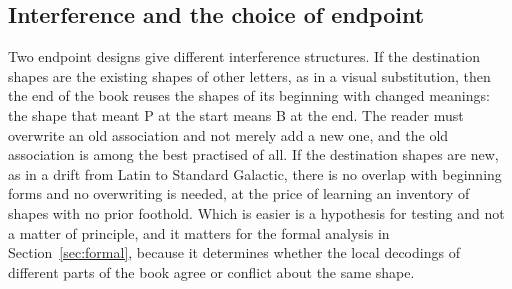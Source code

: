 \subsection{Interference and the choice of endpoint}

Two endpoint designs give different interference structures. If the destination shapes are the existing shapes of other letters, as in a visual substitution, then the end of the book reuses the shapes of its beginning with changed meanings: the shape that meant P at the start means B at the end. The reader must overwrite an old association and not merely add a new one, and the old association is among the best practised of all. If the destination shapes are new, as in a drift from Latin to Standard Galactic, there is no overlap with beginning forms and no overwriting is needed, at the price of learning an inventory of shapes with no prior foothold. Which is easier is a hypothesis for testing and not a matter of principle, and it matters for the formal analysis in Section~\ref{sec:formal}, because it determines whether the local decodings of different parts of the book agree or conflict about the same shape.
